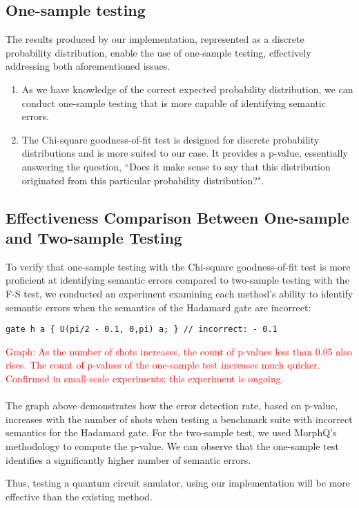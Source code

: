 \documentclass[10pt,a4paper]{article}
\newcommand{\<}{\langle}
\renewcommand{\>}{\rangle}
\newcommand{\red}[1]{\textcolor{red}{#1}}
\begin{document}
\subsection{One-sample testing}

The results produced by our implementation, represented as a discrete probability distribution,
enable the use of one-sample testing, effectively addressing both aforementioned issues.

\begin{enumerate}
  \item
    As we have knowledge of the correct expected probability distribution, we can conduct one-sample
    testing that is more capable of identifying semantic errors.
  \item
    The Chi-square goodness-of-fit test is designed for discrete probability distributions and is more
    suited to our case. It provides a p-value, essentially answering the question, ``Does it make sense
    to say that this distribution originated from this particular probability distribution?".
\end{enumerate}

\subsection{Effectiveness Comparison Between One-sample and Two-sample Testing}
To verify that one-sample testing with the Chi-square goodness-of-fit test is more proficient at
identifying semantic errors compared to two-sample testing with the F-S test, we conducted an
experiment examining each method's ability to identify semantic errors when the semantics of the
Hadamard gate are incorrect:

\begin{lstlisting}
gate h a { U(pi/2 - 0.1, 0,pi) a; } // incorrect: - 0.1
\end{lstlisting}

\red{Graph: As the number of shots increases, the count of p-values less than 0.05 also rises. The
  count of p-values of the one-sample test increases much quicker. Confirmed in small-scale
experiments; this experiment is ongoing.} \\
\\

The graph above demonstrates how the error detection rate, based on p-value, increases with the
number of shots when testing a benchmark suite with incorrect semantics for the Hadamard gate. For
the two-sample test, we used MorphQ's methodology to compute the p-value. We can observe that the
one-sample test identifies a significantly higher number of semantic errors.

Thus, testing a quantum circuit smulator, using our implementation will be more effective than the existing method.
\end{document}
